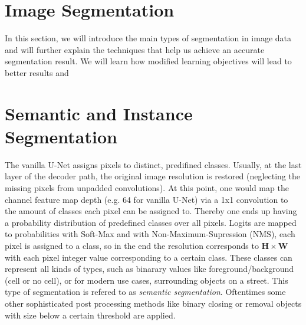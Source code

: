 \section{Image Segmentation}

In this section, we will introduce the main types of segmentation in image data and will further explain the techniques that help us achieve an accurate segmentation result. We will learn how modified learning objectives will lead to better results and 


\section{Semantic and Instance Segmentation}


The vanilla U-Net assigns pixels to distinct, predifined classes. Usually, at the last layer of the decoder path, the original image resolution is restored (neglecting the missing pixels from unpadded convolutions). At this point, one would map the channel feature map depth (e.g. 64 for vanilla U-Net) via a 1x1 convolution to the amount of classes each pixel can be assigned to. Thereby one ends up having a probability distribution of predefined classes over all pixels. Logits are mapped to probabilities with Soft-Max and with Non-Maximum-Supression (NMS), each pixel is assigned to a class, so in the end the resolution corresponds to $\mathbf{H \times W}$ with each pixel integer value corresponding to a certain class. These classes can represent all kinds of types, such as binarary values like foreground/background (cell or no cell), or for modern use cases, surrounding objects on a street. This type of segmentation is refered to as \textit{semantic segmentation}. Oftentimes some other sophisticated post processing methods like binary closing or removal objects with size below a certain threshold are applied.


